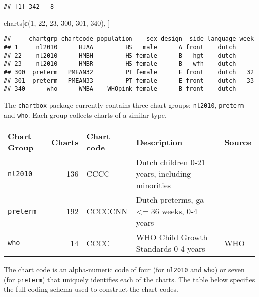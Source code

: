 \documentclass[]{book}
\newenvironment{Shaded}{\begin{snugshade}}{\end{snugshade}}
\newcommand{\DecValTok}[1]{\textcolor[rgb]{0.00,0.00,0.81}{#1}}
\newcommand{\KeywordTok}[1]{\textcolor[rgb]{0.13,0.29,0.53}{\textbf{#1}}}
\newcommand{\NormalTok}[1]{#1}
\begin{document}
\begin{verbatim}
## [1] 342   8
\end{verbatim}

\begin{Shaded}
\begin{Highlighting}[]
\NormalTok{charts[}\KeywordTok{c}\NormalTok{(}\DecValTok{1}\NormalTok{, }\DecValTok{22}\NormalTok{, }\DecValTok{23}\NormalTok{, }\DecValTok{300}\NormalTok{, }\DecValTok{301}\NormalTok{, }\DecValTok{340}\NormalTok{), ]}
\end{Highlighting}
\end{Shaded}

\begin{verbatim}
##     chartgrp chartcode population    sex design  side language week
## 1     nl2010      HJAA         HS   male      A front    dutch     
## 22    nl2010      HMBH         HS female      B   hgt    dutch     
## 23    nl2010      HMBR         HS female      B   wfh    dutch     
## 300  preterm   PMEAN32         PT female      E front    dutch   32
## 301  preterm   PMEAN33         PT female      E front    dutch   33
## 340      who      WMBA    WHOpink female      B front    dutch
\end{verbatim}

The \texttt{chartbox} package currently contains three chart groups: \texttt{nl2010}, \texttt{preterm} and \texttt{who}. Each group collects charts of a similar type.

\begin{longtable}[]{@{}lrlll@{}}
\toprule
Chart Group & Charts & Chart code & Description & Source\tabularnewline
\midrule
\endhead
\texttt{nl2010} & 136 & CCCC & Dutch children 0-21 years, including minorities & \citet{talma2010}\tabularnewline
\texttt{preterm} & 192 & CCCCCNN & Dutch preterms, ga \textless{}= 36 weeks, 0-4 years & \citet{bocca2012}\tabularnewline
\texttt{who} & 14 & CCCC & WHO Child Growth Standards 0-4 years & \href{https://www.who.int/childgrowth/en/}{WHO}\tabularnewline
\bottomrule
\end{longtable}

The chart code is an alpha-numeric code of four (for \texttt{nl2010} and \texttt{who}) or seven (for \texttt{preterm}) that uniquely identifies each of the charts. The table below specifies the full coding schema used to construct the chart codes.
\end{document}
